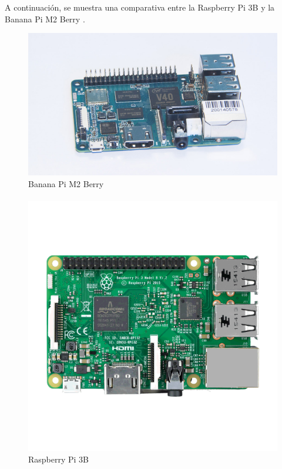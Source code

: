 A continuación, se muestra una comparativa entre la Raspberry Pi 3B y la Banana Pi M2 Berry \citep{MarcoTeorico21}\citep{MarcoTeorico22}.

\begin{figure}[H]
	\centering
	\includegraphics[scale=.8]{Capitulo2/images/bananaPi.jpg}
	\caption{Banana Pi M2 Berry}
	\label{fig:}
\end{figure}

\paragraph{}
\begin{figure}[H]
	\centering
	\includegraphics[scale=.23]{Capitulo2/images/raspberry.png}
	\caption{Raspberry Pi 3B}
	\label{fig:}
\end{figure}

